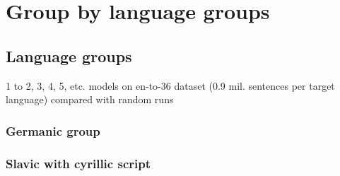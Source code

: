 \chapter{Group by language groups}

\section{Language groups}
1 to 2, 3, 4, 5, etc. models on en-to-36 dataset (0.9 mil. sentences per target language)
compared with random runs
\subsection{Germanic group}




\subsection{Slavic with cyrillic script}

